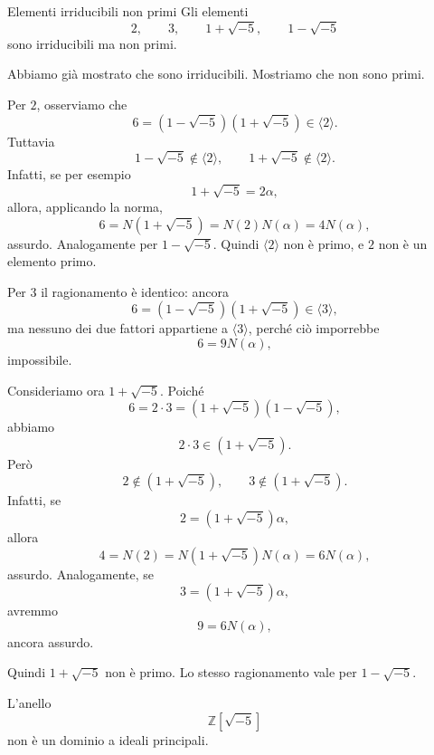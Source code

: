 \documentclass[a4paper]{article}
\begin{document}
\begin{radioactive}
\begin{snippetproposition}{Elementi irriducibili non primi}
    Gli elementi
    \[
        2,
        \qquad
        3,
        \qquad
        1+\sqrt{-5},
        \qquad
        1-\sqrt{-5}
    \]
    sono irriducibili ma non primi.
\end{snippetproposition}
\end{radioactive}

\begin{radioactive}
\begin{snippetproof}{}
    Abbiamo già mostrato che sono irriducibili. Mostriamo che non sono primi.

    Per \(2\), osserviamo che
    \[
        6=(1-\sqrt{-5})(1+\sqrt{-5})\in \langle 2 \rangle.
    \]
    Tuttavia
    \[
        1-\sqrt{-5}\notin \langle 2 \rangle,
        \qquad
        1+\sqrt{-5}\notin \langle 2 \rangle.
    \]
    Infatti, se per esempio
    \[
        1+\sqrt{-5}=2\alpha,
    \]
    allora, applicando la norma,
    \[
        6=N(1+\sqrt{-5})=N(2)N(\alpha)=4N(\alpha),
    \]
    assurdo. Analogamente per \(1-\sqrt{-5}\).
    Quindi \(\langle 2 \rangle\) non è primo, e \(2\) non è un elemento primo.

    Per \(3\) il ragionamento è identico: ancora
    \[
        6=(1-\sqrt{-5})(1+\sqrt{-5})\in \langle 3 \rangle,
    \]
    ma nessuno dei due fattori appartiene a \(\langle 3 \rangle\), perché ciò imporrebbe
    \[
        6=9N(\alpha),
    \]
    impossibile.

    Consideriamo ora \(1+\sqrt{-5}\). Poiché
    \[
        6=2\cdot 3=(1+\sqrt{-5})(1-\sqrt{-5}),
    \]
    abbiamo
    \[
        2\cdot 3\in (1+\sqrt{-5}).
    \]
    Però
    \[
        2\notin (1+\sqrt{-5}),
        \qquad
        3\notin (1+\sqrt{-5}).
    \]
    Infatti, se
    \[
        2=(1+\sqrt{-5})\alpha,
    \]
    allora
    \[
        4=N(2)=N(1+\sqrt{-5})N(\alpha)=6N(\alpha),
    \]
    assurdo. Analogamente, se
    \[
        3=(1+\sqrt{-5})\alpha,
    \]
    avremmo
    \[
        9=6N(\alpha),
    \]
    ancora assurdo.

    Quindi \(1+\sqrt{-5}\) non è primo. Lo stesso ragionamento vale per \(1-\sqrt{-5}\).
\end{snippetproof}
\end{radioactive}

\begin{radioactive}
\begin{snippetcorollary}{}
    L'anello
    \[
        \mathbb{Z}[\sqrt{-5}]
    \]
    non è un dominio a ideali principali.
\end{snippetcorollary}
\end{radioactive}
\end{document}
